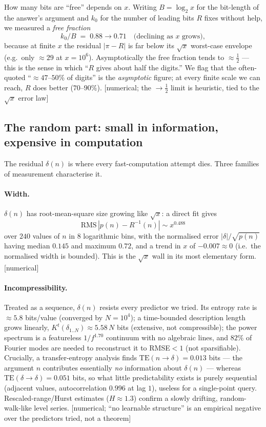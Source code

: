 \documentclass[11pt]{article}
\theoremstyle{plain}
\theoremstyle{definition}
\theoremstyle{remark}
\newcommand{\stat}[1]{\quad\textnormal{\footnotesize\textsf{[\textcolor{accent}{#1}]}}}
\newcommand{\Rinv}{R^{-1}}
\begin{document}
How many bits are ``free'' depends on $x$. Writing $B=\log_2 x$ for the bit-length
of the answer's argument and $k_0$ for the number of leading bits $R$ fixes
without help, we measured a \emph{free fraction}
\[
  k_0/B \;=\; 0.88 \longrightarrow 0.71 \quad\text{(declining as $x$ grows)},
\]
because at finite $x$ the residual $|\pi-R|$ is far below its $\sqrt{x}$
worst-case envelope (e.g.\ only ${\approx}29$ at $x=10^6$). Asymptotically the
free fraction tends to ${\approx}\tfrac12$ --- this is the sense in which ``$R$
gives about half the digits.'' We flag that the often-quoted ``${\approx}47$--$50\%$
of digits'' is the \emph{asymptotic} figure; at every finite scale we can reach,
$R$ does better ($70$--$90\%$).
\stat{numerical; the $\to\tfrac12$ limit is heuristic, tied to the $\sqrt{x}$ error law}

\subsection{The random part: small in information, expensive in computation}

The residual $\delta(n)$ is where every fast-computation attempt dies. Three
families of measurement characterise it.

\paragraph{Width.}
$\delta(n)$ has root-mean-square size growing like $\sqrt{x}$: a direct fit gives
\[
  \mathrm{RMS}\,|p(n)-\Rinv(n)| \sim x^{0.488}
\]
over $240$ values of $n$ in $8$ logarithmic bins, with the normalised error
$|\delta|/\sqrt{p(n)}$ having median $0.145$ and maximum $0.72$, and a trend in
$x$ of $-0.007\approx 0$ (i.e.\ the normalised width is bounded). This is the
$\sqrt{x}$ wall in its most elementary form.
\stat{numerical}

\paragraph{Incompressibility.}
Treated as a sequence, $\delta(n)$ resists every predictor we tried. Its entropy
rate is ${\approx}5.8$ bits/value (converged by $N=10^4$); a time-bounded
description length grows linearly, $K^t(\delta_{1..N})\approx 5.58\,N$ bits
(extensive, not compressible); the power spectrum is a featureless
$1/f^{1.70}$ continuum with no algebraic lines, and $82\%$ of Fourier modes are
needed to reconstruct it to RMSE${<}1$ (not sparsifiable). Crucially, a
transfer-entropy analysis finds $\mathrm{TE}(n\to\delta)=0.013$ bits --- the
argument $n$ contributes essentially \emph{no} information about $\delta(n)$ ---
whereas $\mathrm{TE}(\delta\to\delta)=0.051$ bits, so what little predictability
exists is purely sequential (adjacent values, autocorrelation $0.996$ at lag $1$),
useless for a single-point query. Rescaled-range/Hurst estimates ($H\approx 1.3$)
confirm a slowly drifting, random-walk-like level series.
\stat{numerical; ``no learnable structure'' is an empirical negative over the predictors tried, not a theorem}
\end{document}
